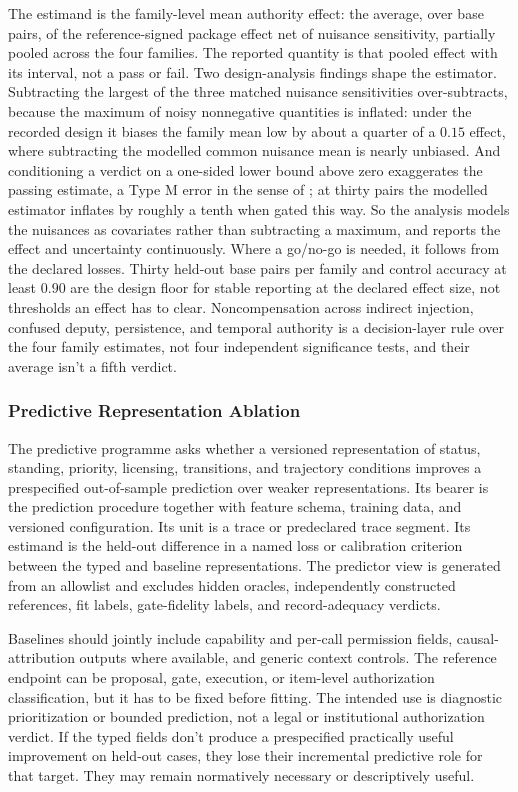 The estimand is the family-level mean authority effect: the average, over base pairs, of the reference-signed package effect net of nuisance sensitivity, partially pooled across the four families. The reported quantity is that pooled effect with its interval, not a pass or fail. Two design-analysis findings shape the estimator. Subtracting the largest of the three matched nuisance sensitivities over-subtracts, because the maximum of noisy nonnegative quantities is inflated: under the recorded design it biases the family mean low by about a quarter of a \(0.15\) effect, where subtracting the modelled common nuisance mean is nearly unbiased. And conditioning a verdict on a one-sided lower bound above zero exaggerates the passing estimate, a Type M error in the sense of \textcite{gelman2014types}; at thirty pairs the modelled estimator inflates by roughly a tenth when gated this way. So the analysis models the nuisances as covariates rather than subtracting a maximum, and reports the effect and uncertainty continuously. Where a go/no-go is needed, it follows from the declared losses. Thirty held-out base pairs per family and control accuracy at least \(0.90\) are the design floor for stable reporting at the declared effect size, not thresholds an effect has to clear. Noncompensation across indirect injection, confused deputy, persistence, and temporal authority is a decision-layer rule over the four family estimates, not four independent significance tests, and their average isn't a fifth verdict.

\subsubsection{Predictive Representation Ablation}

The predictive programme asks whether a versioned representation of status, standing, priority, licensing, transitions, and trajectory conditions improves a prespecified out-of-sample prediction over weaker representations. Its bearer is the prediction procedure together with feature schema, training data, and versioned configuration. Its unit is a trace or predeclared trace segment. Its estimand is the held-out difference in a named loss or calibration criterion between the typed and baseline representations. The predictor view is generated from an allowlist and excludes hidden oracles, independently constructed references, fit labels, gate-fidelity labels, and record-adequacy verdicts.

Baselines should jointly include capability and per-call permission fields, causal-attribution outputs where available, and generic context controls. The reference endpoint can be proposal, gate, execution, or item-level authorization classification, but it has to be fixed before fitting. The intended use is diagnostic prioritization or bounded prediction, not a legal or institutional authorization verdict. If the typed fields don't produce a prespecified practically useful improvement on held-out cases, they lose their incremental predictive role for that target. They may remain normatively necessary or descriptively useful.

